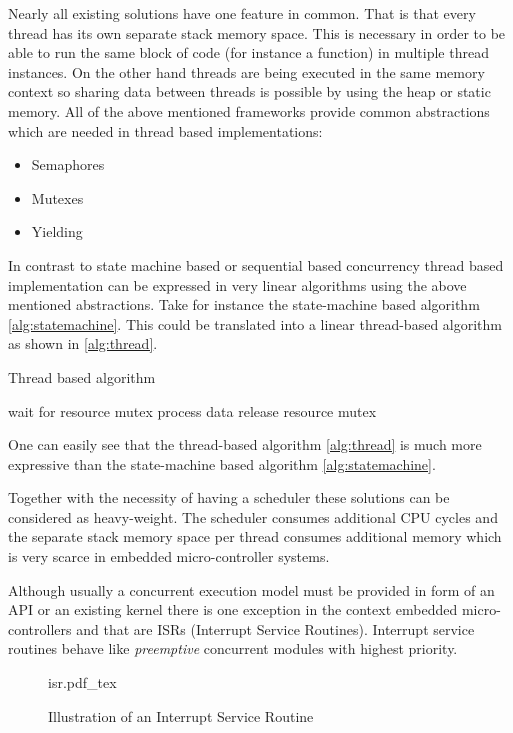 Nearly all existing solutions have one feature in common. That is that every thread has its own separate stack memory space. This is necessary in order to be able to run the same block of code (for instance a function) in multiple thread instances. On the other hand threads are being executed in the same memory context so sharing data between threads is possible by using the heap or static memory. All of the above mentioned frameworks provide common abstractions which are needed in thread based implementations:

\begin{itemize}
    \item Semaphores
    \item Mutexes
    \item Yielding
\end{itemize}

In contrast to state machine based or sequential based concurrency thread based implementation can be expressed in very linear algorithms using the above mentioned abstractions. Take for instance the state-machine based algorithm \ref{alg:statemachine}. This could be translated into a linear thread-based algorithm as shown in \ref{alg:thread}.

\begin{algorithm}[H]
\caption{Thread based algorithm}
\label{alg:thread}
\begin{algorithmic}
    \STATE wait for resource mutex
    \STATE process data
    \STATE release resource mutex
\ENDWHILE
\end{algorithmic}
\end{algorithm}

One can easily see that the thread-based algorithm \ref{alg:thread} is much more expressive than the state-machine based algorithm \ref{alg:statemachine}.

Together with the necessity of having a scheduler these solutions can be considered as heavy-weight. The scheduler consumes additional CPU cycles and the separate stack memory space per thread consumes additional memory which is very scarce in embedded micro-controller systems.

Although usually a concurrent execution model must be provided in form of an API or an existing kernel there is one exception in the context embedded micro-controllers and that are ISRs (Interrupt Service Routines). Interrupt service routines behave like \emph{preemptive} concurrent modules with highest priority.

\begin{figure}[H]
\centering
{isr.pdf_tex}
\caption{Illustration of an Interrupt Service Routine}
\end{figure}

